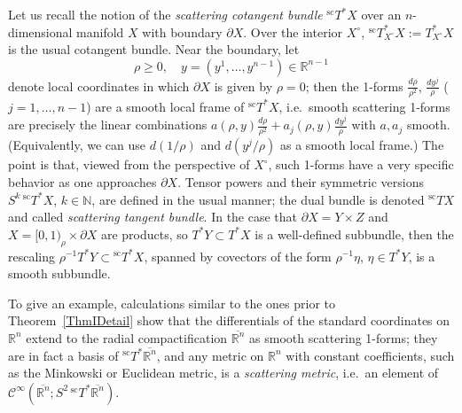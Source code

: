 \documentclass[reqno,11pt,letterpaper]{amsart}
\numberwithin{equation}{section}
\numberwithin{figure}{section}
\theoremstyle{definition}
\theoremstyle{remark}
\newcommand{\mc}{\mathcal}
\newcommand{\cC}{\mc C}
\newcommand{\N}{\mathbb{N}}
\newcommand{\R}{\mathbb{R}}
\newcommand{\ol}{\overline}
\newcommand{\pa}{\partial}
\newcommand{\scl}{{\mathrm{sc}}}
\newcommand{\Tsc}{{}^{\scl}T}
\newcommand{\CI}{\cC^\infty}
\begin{document}
Let us recall the notion of the \emph{scattering cotangent bundle} $\Tsc^*X$ over an $n$-dimensional manifold $X$ with boundary $\pa X$. Over the interior $X^\circ$, $\Tsc^*_{X^\circ}X:=T^*_{X^\circ}X$ is the usual cotangent bundle. Near the boundary, let
\begin{equation}
\label{EqCptCoord}
  \rho\geq 0,\quad y=(y^1,\ldots,y^{n-1})\in\R^{n-1}
\end{equation}
denote local coordinates in which $\pa X$ is given by $\rho=0$; then the 1-forms $\frac{d\rho}{\rho^2}$, $\frac{d y^j}{\rho}$ ($j=1,\ldots,n-1$) are a smooth local frame of $\Tsc^*X$, i.e.\ smooth scattering 1-forms are precisely the linear combinations $a(\rho,y)\frac{d\rho}{\rho^2}+a_j(\rho,y)\frac{d y^j}{\rho}$ with $a,a_j$ smooth. (Equivalently, we can use $d(1/\rho)$ and $d(y^j/\rho)$ as a smooth local frame.) The point is that, viewed from the perspective of $X^\circ$, such 1-forms have a very specific behavior as one approaches $\pa X$. Tensor powers and their symmetric versions $S^k\,\Tsc^*X$, $k\in\N$, are defined in the usual manner; the dual bundle is denoted $\Tsc X$ and called \emph{scattering tangent bundle}. In the case that $\pa X=Y\times Z$ and $X=[0,1)_\rho\times\pa X$ are products, so $T^*Y\subset T^*X$ is a well-defined subbundle, then the rescaling $\rho^{-1}T^*Y\subset\Tsc^*X$, spanned by covectors of the form $\rho^{-1}\eta$, $\eta\in T^*Y$, is a smooth subbundle.

To give an example, calculations similar to the ones prior to Theorem~\ref{ThmIDetail} show that the differentials of the standard coordinates on $\R^n$ extend to the radial compactification $\ol{\R^n}$ as smooth scattering 1-forms; they are in fact a basis of $\Tsc^*\ol{\R^n}$, and any metric on $\R^n$ with constant coefficients, such as the Minkowski or Euclidean metric, is a \emph{scattering metric}, i.e.\ an element of $\CI(\ol{\R^n};S^2\,\Tsc^*\ol{\R^n})$.
\end{document}
